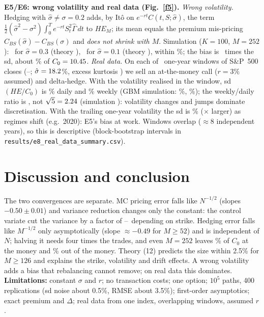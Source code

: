 \documentclass[10pt,a4paper]{article}
\begin{document}
\textbf{E5/E6: wrong volatility and real data (Fig.~\ref{f5}).} \emph{Wrong volatility.} Hedging with $\hat\sigma\ne\sigma=0.2$ adds, by It\^o on $e^{-rt}C(t,S;\hat\sigma)$, the term $\frac12(\hat\sigma^2-\sigma^2)\int_0^Te^{-rt}S_t^2\hat\Gamma\,dt$ to $HE_M$; its mean equals the premium mis-pricing $C_{BS}(\hat\sigma)-C_{BS}(\sigma)$ and \emph{does not shrink with $M$}. Simulation ($K=100$, $M=252$): \wvSimHigh\ for $\hat\sigma=0.3$ (theory \wvThHigh), \wvSimLow\ for $\hat\sigma=0.1$ (theory \wvThLow), within \wvMaxRelGap\%; the bias is \wvRatioHigh\ times the sd, about \wvRelHigh\% of $C_0=10.45$. \emph{Real data.} On each of \rwN\ one-year windows of S\&P~500 closes (\spStart--\spEnd; $\hat\sigma=18.2$\%, excess kurtosis \spKurt) we sell an at-the-money call ($r=3\%$ assumed) and delta-hedge. With the volatility realised in the window, sd$(HE/C_0)$ is \rwSdDailyHind\% daily and \rwSdWeeklyHind\% weekly (GBM simulation: \rwSdDailySim\%, \rwSdWeeklySim\%); the weekly/daily ratio is \rwRatioReal, not $\sqrt5=2.24$ (simulation \rwRatioSim): volatility changes and jumps dominate discretisation. With the trailing one-year volatility the sd is \rwSdDailyTrail\% (\rwRatioDailyHindVsTrail$\times$ larger) as regimes shift (e.g.\ 2020): E5's bias at work. Windows overlap ($\approx8$ independent years), so this is descriptive (block-bootstrap intervals in \texttt{results/e8\_real\_data\_summary.csv}).

\section{Discussion and conclusion}
The two convergences are separate. MC pricing error falls like $N^{-1/2}$ (slopes $-0.50\pm0.01$) and variance reduction changes only the constant: the control variate cut the variance by a factor of \vrCvC--\vrCvA\ depending on strike. Hedging error falls like $M^{-1/2}$ only asymptotically (slope $\approx-0.49$ for $M\ge52$) and is independent of $N$; halving it needs four times the trades, and even $M=252$ leaves \relRmseTwoFiftyTwoB\% of $C_0$ at the money and \relRmseTwoFiftyTwoC\% out of the money. Theory (12) predicts the size within 2.5\% for $M\ge126$ and explains the strike, volatility and drift effects. A wrong volatility adds a bias that rebalancing cannot remove; on real data this dominates. \textbf{Limitations:} constant $\sigma$ and $r$; no transaction costs; one option; $10^5$ paths, 400 replications (sd noise about 0.5\%, RMSE about 3.5\%); first-order asymptotics; exact premium and $\Delta$; real data from one index, overlapping windows, assumed $r$.
\end{document}
